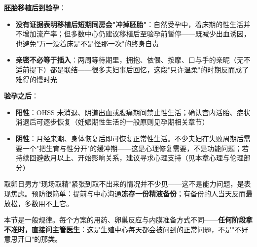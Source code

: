 \vspace{0.5em}
\noindent\textbf{胚胎移植后到验孕}：

\begin{itemize}
	\item \textbf{没有证据表明移植后短期同房会"冲掉胚胎"}：自然受孕中，着床期的性生活并不增加流产率；但多数中心仍建议移植后至验孕前暂停——既减少出血诱因，也避免"万一没着床是不是怪那一次"的终身自责
	\item \textbf{亲密不必等于插入}：两周等待期里，拥抱、依偎、按摩、口与手的亲昵（无不适前提下）都是联结——很多夫妇事后回忆，这段"只许温柔"的时期反而成了难得的慢时光
\end{itemize}

\vspace{0.5em}
\noindent\textbf{验孕之后}：

\begin{itemize}
	\item \textbf{阳性}：OHSS 未消退、阴道出血或腹痛期间禁止性生活；确认宫内活胎、症状消退后可逐步恢复（妊娠期性生活的一般原则见孕期相关章节）
	\item \textbf{阴性}：月经来潮、身体恢复后即可恢复正常性生活。不少夫妇在失败周期后需要一个"把生育与性分开"的缓冲期——这是心理修复需要，不是功能问题；若持续回避数月以上、开始影响关系，建议寻求心理支持（见本章心理与伦理部分）
\end{itemize}

\begin{tcolorbox}[colback=pink!5!white,colframe=red!50!black,title=贴心小叮咛]
取卵日男方"现场取精"紧张到取不出来的情况并不少见——这不是能力问题，是表现焦虑。预防很简单：提前与中心沟通\textbf{冻存一份精液备份}；有备份的人当天反而最放松，多数用不上它。
\end{tcolorbox}

本节是一般规律。每个方案的用药、卵巢反应与内膜准备方式不同——\textbf{任何阶段拿不准时，直接问主管医生}：这是生殖中心每天都会被问到的正常问题，不是"不好意思开口"的那类。
